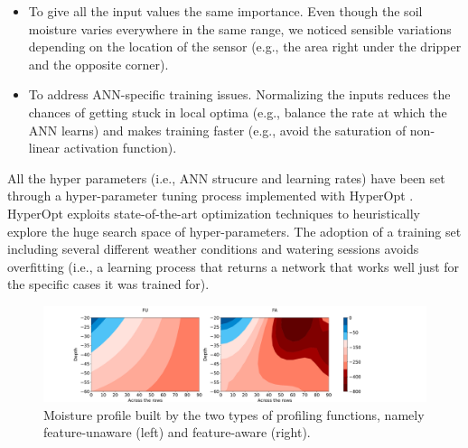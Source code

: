 \begin{itemize}
    \item To give all the input values the same importance. Even though the soil moisture varies everywhere in the same range, we noticed sensible variations depending on the location of the sensor (e.g., the area right under the dripper and the opposite corner).
    \item To address ANN-specific training issues. Normalizing the inputs reduces the chances of getting stuck in local optima (e.g., balance the rate at which the ANN learns) and makes training faster (e.g., avoid the saturation of non-linear activation function).
\end{itemize}

All the hyper parameters (i.e., ANN strucure and learning rates) have been set through a hyper-parameter tuning process implemented with HyperOpt \citep{bergstra2015hyperopt}. HyperOpt exploits state-of-the-art optimization techniques to heuristically explore the huge search space of hyper-parameters. The adoption of a training set including several different weather conditions and watering sessions avoids overfitting (i.e., a learning process that returns a network that works well just for the specific cases it was trained for).


\begin{figure}[t]
\centering
\includegraphics[scale=.25]{chapters/physics-aware/pluto/img/countor_plot.pdf}
\caption{Moisture profile built by the two types of profiling functions, namely feature-unaware (left) and feature-aware (right).}
\label{pluto-fig:FU_FA}
\end{figure}

